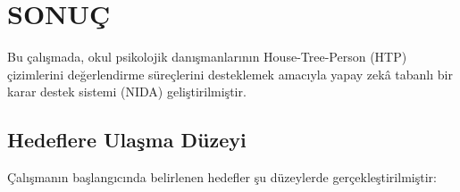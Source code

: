 
\chapter{SONUÇ}

Bu çalışmada, okul psikolojik danışmanlarının House-Tree-Person (HTP) çizimlerini değerlendirme süreçlerini desteklemek amacıyla yapay zekâ tabanlı bir karar destek sistemi (NIDA) geliştirilmiştir.

\section{Hedeflere Ulaşma Düzeyi}

Çalışmanın başlangıcında belirlenen hedefler şu düzeylerde gerçekleştirilmiştir:

